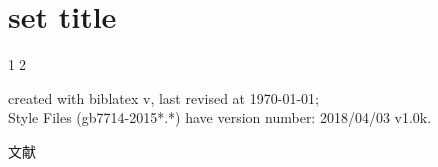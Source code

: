 \documentclass[twoside]{article}
\makeatletter
\def\versionofgbtstyle{2018/04/03 v1.0k}
\def\versionofbiblatex{\abx@version}
\makeatother
\begin{document}
    \section{set title}
    
    \textcircled{12}
    
    created with biblatex v\versionofbiblatex, last revised at \today;\\ \hspace*{1.5em} Style Files (gb7714-2015*.*) have version number: \versionofgbtstyle.

	文献\nocite{*}

    \printbibliography

    
\end{document}

